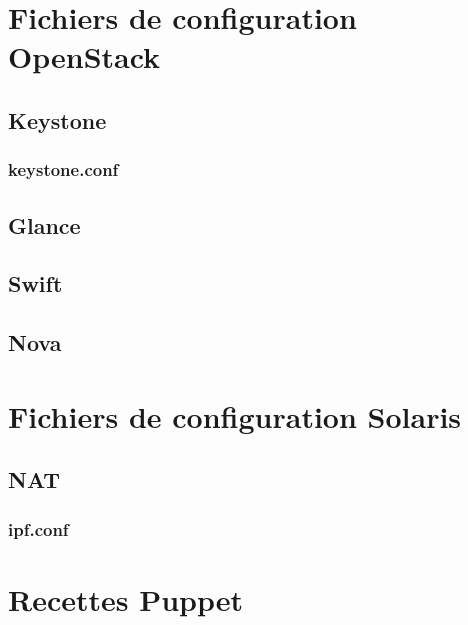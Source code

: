 \documentclass{report}
\begin{document}
\appendix

\chapter{Fichiers de configuration OpenStack}
\section{Keystone}
\subsection{keystone.conf}

\section{Glance}

\section{Swift}

\section{Nova}

\chapter{Fichiers de configuration Solaris}
\section{NAT}
\subsection{ipf.conf}

\chapter{Recettes Puppet}
\end{document}
